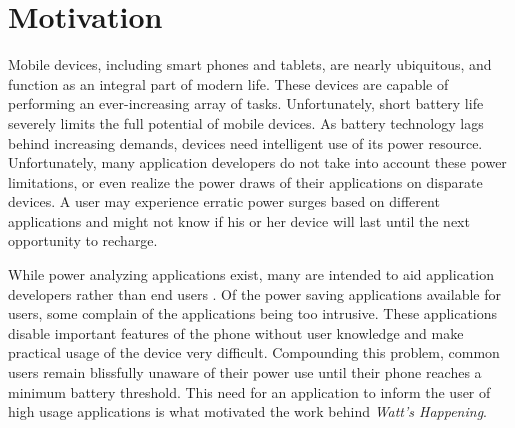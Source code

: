 \section*{Motivation}
\label{sec:motivation}
Mobile devices, including smart phones and tablets, are nearly ubiquitous, and function as an integral part of modern life. 
These devices are capable of performing an ever-increasing array of tasks. 
Unfortunately, short battery life severely limits the full potential of mobile devices. 
As battery technology lags behind increasing demands, devices need intelligent use of its power resource. 
Unfortunately, many application developers do not take into account these power limitations, or even realize the power draws of their applications on disparate devices. 
A user may experience erratic power surges based on different applications and might not know if his or her device will last until the next opportunity to recharge. 

While power analyzing applications exist, many are intended to aid application developers rather than end users \cite{Pathak:2012:ESI:2168836.2168841} \cite{energy-aware}. 
Of the power saving applications available for users, some complain of the applications being too intrusive. 
These applications disable important features of the phone without user knowledge and make practical usage of the device very difficult. 
Compounding this problem, common users remain blissfully unaware of their power use until their phone reaches a minimum battery threshold.
This need for an application to inform the user of high usage applications is what motivated the work behind \emph{Watt's Happening}.
